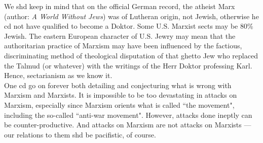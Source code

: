 We shd keep in mind that on the official German record, the atheist Marx (author: \emph{A World Without Jews}) was of Lutheran origin, not Jewish, otherwise he cd not have qualified to become a Doktor. Some U.S. Marxist sects may be 80\% Jewish. The eastern European character of U.S. Jewry may mean that the authoritarian practice of Marxism may have been influenced by the factious, discriminating method of theological disputation of that ghetto Jew who replaced the Talmud (or whatever) with the writings of the Herr Doktor professing Karl. Hence, sectarianism as we know it.\\
One cd go on forever both detailing and conjecturing what is wrong with Marxism and Marxists. It is impossible to be too devastating in attacks on Marxism, especially since Marxism orients what is called ``the movement", including the so-called ``anti-war movement". However, attacks done ineptly can be counter-productive. And attacks on Marxism are not attacks on Marxists --- our relations to them shd be pacifistic, of course.

